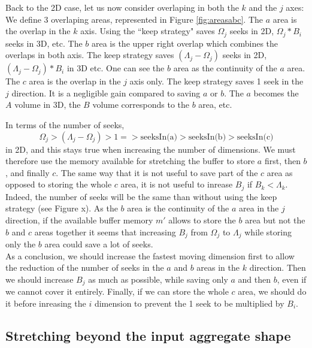 \documentclass[conference]{IEEEtran}
\begin{document}
Back to the 2D case, let us now consider overlaping in both the $k$ and the $j$ axes:
We define 3 overlaping areas, represented in Figure \ref{fig:areasabc}.
The $a$ area is the overlap in the $k$ axis.
Using the ``keep strategy" saves $\Omega_j$ seeks in 2D, $\Omega_j*B_i$ seeks in 3D, etc.
The $b$ area is the upper right overlap which combines the overlaps in both axis. The keep strategy saves $(\Lambda_j-\Omega_j)$ seeks in 2D, $(\Lambda_j-\Omega_j)*B_i$ in 3D etc.
One can see the $b$ area as the continuity of the $a$ area.
The $c$ area is the overlap in the $j$ axis only.
The keep strategy saves 1 seek in the $j$ direction.
It is a negligible gain compared to saving $a$ or $b$.
The $a$ becomes the $A$ volume in 3D, the $B$ volume corresponds to the $b$ area, etc.

In terms of the number of seeks, $$\Omega_j > (\Lambda_j-\Omega_j) > 1 => \textrm{seeksIn(a)} > \textrm{seeksIn(b)} > \textrm{seeksIn(c)}$$ in 2D, and this stays true when increasing the number of dimensions.
We must therefore use the memory available for stretching the buffer to store $a$ first, then $b$, and finally $c$.
The same way that it is not useful to save part of the $c$ area as opposed to storing the whole $c$ area, it is not useful to inrease $B_j$ if $B_k < \Lambda_k$.
Indeed, the number of seeks will be the same than without using the keep strategy (see Figure x).
As the $b$ area is the continuity of the $a$ area in the $j$ direction, if the available buffer memory $m'$ allows to store the $b$ area but not the $b$ and $c$ areas together it seems that increasing $B_j$ from $\Omega_j$ to $\Lambda_j$ while storing only the $b$ area could save a lot of seeks. \\

As a conclusion, we should increase the fastest moving dimension first to allow the reduction of the number of seeks in the $a$ and $b$ areas in the $k$ direction.
Then we should increase $B_j$ as much as possible, while saving only $a$ and then $b$, even if we cannot cover it entirely.
Finally, if we can store the whole $c$ area, we should do it before inreasing the $i$ dimension to prevent the 1 seek to be multiplied by $B_i$. \\

\subsection{Stretching beyond the input aggregate shape}
\end{document}
